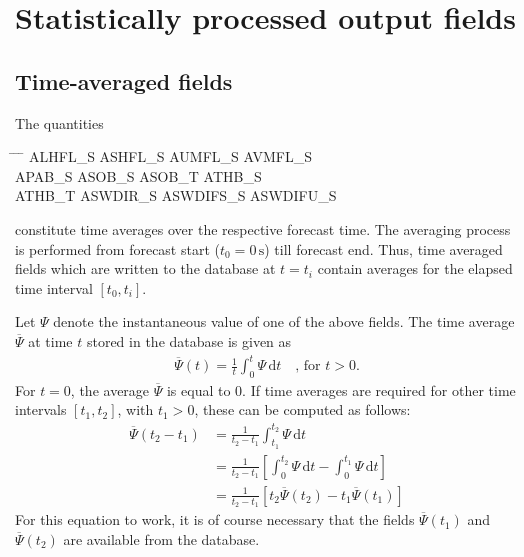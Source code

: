 \section{Statistically processed output fields}
\label{sec_statproc_fields}

\subsection{Time-averaged fields}

The quantities
\begin{note}
\begin{tabbing}
  \hspace{0.2\textwidth} \= \hspace{0.2\textwidth} \= \hspace{0.2\textwidth} \= \hspace{0.2\textwidth} \kill
  ALHFL\_S \>
  ASHFL\_S \>
  AUMFL\_S \>
  AVMFL\_S \\
  APAB\_S  \>
  ASOB\_S  \>
  ASOB\_T  \>
  ATHB\_S  \\
  ATHB\_T  \>
  ASWDIR\_S  \>
  ASWDIFS\_S  \>
  ASWDIFU\_S
\end{tabbing}
\end{note}

constitute time averages over the respective forecast time. The averaging process is performed from forecast start  
($t_{0}=0\,\mathrm{s}$) till forecast end. Thus, time averaged fields which are written to the database at $t=t_{i}$ 
contain averages for the elapsed time interval $[t_{0}, t_{i}]$.

Let $\Psi$ denote the instantaneous value of one of the above fields. The time average $\overline{\Psi}$ at time $t$ stored in the 
database is given as
\begin{align*}
 \overline{\Psi}(t) = \frac{1}{t}\int_{0}^{t} \Psi\, \mathrm{d}t  \quad \text{, for } t>0.
\end{align*}
For $t=0$, the average $\overline{\Psi}$ is equal to 0. 
If time averages are required for other time intervals $[t_{1},t_{2}]$, with $t_{1}>0$, these can be computed as follows:
\begin{align*}
 \overline{\Psi}(t_{2}-t_{1}) &= \frac{1}{t_{2}-t_{1}}\int_{t_{1}}^{t_{2}} \Psi\,\mathrm{d}t \\
                              &= \frac{1}{t_{2}-t_{1}} \left[\int_{0}^{t_{2}} \Psi\,\mathrm{d}t  - \int_{0}^{t_{1}} \Psi\,\mathrm{d}t \right] \\
                              &= \frac{1}{t_{2}-t_{1}} \left[ t_{2}\overline{\Psi}(t_{2}) - t_{1}\overline{\Psi}(t_{1}) \right]
\end{align*}
For this equation to work, it is of course necessary that the fields $\overline{\Psi}(t_{1})$ and $\overline{\Psi}(t_{2})$ are available from the database.



